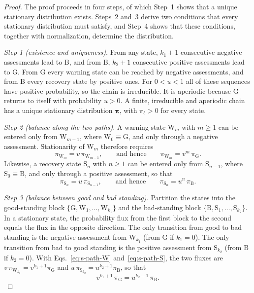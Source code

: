 \documentclass[10pt]{wlscirep}
\newcommand{\st}[1]{\mathrm{#1}}           %
\theoremstyle{plain}
\theoremstyle{remark}
\begin{document}
\begin{proof}
The proof proceeds in four steps, of which Step~1 shows that a unique stationary distribution exists. Steps~2 and~3 derive two conditions that every stationary distribution must satisfy, and Step~4 shows that these conditions, together with normalization, determine the distribution.

\textit{Step 1 (existence and uniqueness).} From any state, $k_1+1$ consecutive negative assessments lead to B, and from B, $k_2+1$ consecutive positive assessments lead to G. From G every warning state can be reached by negative assessments, and from B every recovery state by positive ones. For $0<u<1$ all of these sequences have positive probability, so the chain is irreducible. It is aperiodic because G returns to itself with probability $u>0$. A finite, irreducible and aperiodic chain has a unique stationary distribution $\bm\pi$, with $\pi_\ell>0$ for every state.

\textit{Step 2 (balance along the two paths).} A warning state $\st W_m$ with $m\geq1$ can be entered only from $\st W_{m-1}$, where $\st W_0\equiv\st G$, and only through a negative assessment. Stationarity of $\st W_m$ therefore requires
\begin{equation}
\pi_{\st W_m}=v\,\pi_{\st W_{m-1}},
\qquad\text{and hence}\qquad
\pi_{\st W_m}=v^{m}\,\pi_{\st G}.
\label{eq:s-path-W}
\end{equation}
Likewise, a recovery state $\st S_n$ with $n\geq1$ can be entered only from $\st S_{n-1}$, where $\st S_0\equiv\st B$, and only through a positive assessment, so that
\begin{equation}
\pi_{\st S_n}=u\,\pi_{\st S_{n-1}},
\qquad\text{and hence}\qquad
\pi_{\st S_n}=u^{n}\,\pi_{\st B}.
\label{eq:s-path-S}
\end{equation}

\textit{Step 3 (balance between good and bad standing).} Partition the states into the good-standing block $\{\st G,\st W_1,\ldots,\st W_{k_1}\}$ and the bad-standing block $\{\st B,\st S_1,\ldots,\st S_{k_2}\}$. In a stationary state, the probability flux from the first block to the second equals the flux in the opposite direction. The only transition from good to bad standing is the negative assessment from $\st W_{k_1}$ (from G if $k_1=0$). The only transition from bad to good standing is the positive assessment from $\st S_{k_2}$ (from B if $k_2=0$). With Eqs.~\eqref{eq:s-path-W} and~\eqref{eq:s-path-S}, the two fluxes are $v\,\pi_{\st W_{k_1}}=v^{k_1+1}\pi_{\st G}$ and $u\,\pi_{\st S_{k_2}}=u^{k_2+1}\pi_{\st B}$, so that
\begin{equation}
v^{k_1+1}\,\pi_{\st G}=u^{k_2+1}\,\pi_{\st B}.
\label{eq:s-flux}
\end{equation}


\end{proof}
\end{document}
